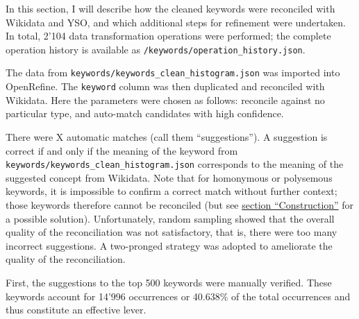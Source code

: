 In this section, I will describe how the cleaned keywords were
reconciled with Wikidata and YSO, and which additional steps for
refinement were undertaken. In total, 2'104 data transformation
operations were performed; the complete operation history is available
as \texttt{/keywords/operation\_history.json}.

The data from \texttt{keywords/keywords\_clean\_histogram.json} was
imported into OpenRefine. The \texttt{keyword} column was then
duplicated and reconciled with Wikidata. Here the parameters were chosen
as follows: reconcile against no particular type, and auto-match
candidates with high confidence.

There were X automatic matches (call them ``suggestions''). A suggestion
is correct if and only if the meaning of the keyword from
\texttt{keywords/keywords\_clean\_histogram.json} corresponds to the
meaning of the suggested concept from Wikidata. Note that for homonymous
or polysemous keywords, it is impossible to confirm a correct match
without further context; those keywords therefore cannot be reconciled
(but see \protect\hyperlink{construction}{section ``Construction''} for
a possible solution). Unfortunately, random sampling showed that the
overall quality of the reconciliation was not satisfactory, that is,
there were too many incorrect suggestions. A two-pronged strategy was
adopted to ameliorate the quality of the reconciliation.

First, the suggestions to the top 500 keywords were manually verified.
These keywords account for 14'996 occurrences or 40.638\% of the total
occurrences and thus constitute an effective lever.

